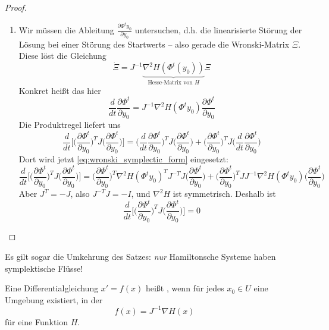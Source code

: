 \begin{proof}
\begin{enumerate}[label=(zu \arabic*), leftmargin=*]
		\item Wir müssen die Ableitung $\frac{\partial \Phi^t y_0}{\partial y_0}$ untersuchen, d.h. die linearisierte Störung der Lösung bei einer Störung des Startwerts -- also gerade die Wronski-Matrix $\Xi$. Diese löst die Gleichung
		\begin{equation*}
			\dot \Xi = J^{-1} \underbrace{\nabla^2 H( \Phi^t(y_0) )}_{\text{Hesse-Matrix von $H$}} \Xi
		\end{equation*}
		Konkret heißt das hier
		\begin{equation}
			\label{eq:wronski_symplectic_form}
			\frac{d}{dt} \frac{\partial \Phi^t}{\partial y_0}
			= J^{-1} \nabla^2 H(\Phi^t y_0) \frac{\partial \Phi^t}{\partial y_0}
		\end{equation}
		Die Produktregel liefert uns
		\begin{equation*}
			\frac{d}{dt}\bigg[ \bigg(\frac{\partial \Phi^t}{\partial y_0}\bigg)^T J \bigg(\frac{\partial \Phi^t}{\partial y_0}\bigg) \bigg]
			= \bigg( \frac{d}{dt} \frac{\partial \Phi^t}{\partial y_0} \bigg)^T J \bigg( \frac{\partial \Phi^t}{\partial y_0} \bigg)
			+ \bigg( \frac{\partial \Phi^t}{\partial y_0} \bigg)^T J \bigg( \frac{d}{dt} \frac{\partial \Phi^t}{\partial y_0} \bigg)
		\end{equation*}
		Dort wird jetzt \eqref{eq:wronski_symplectic_form} eingesetzt:
		\begin{equation*}
			\frac{d}{dt}\bigg[ \bigg(\frac{\partial \Phi^t}{\partial y_0}\bigg)^T J \bigg(\frac{\partial \Phi^t}{\partial y_0}\bigg) \bigg]
			=
			\bigg(\frac{\partial \Phi^t}{\partial y_0}\bigg)^T \nabla^2 H(\Phi^t y_0)^T J^{-T} J \bigg(\frac{\partial \Phi^t}{\partial y_0}\bigg)
			+ \bigg(\frac{\partial \Phi^t}{\partial y_0}\bigg)^T J J^{-1} \nabla^2 H(\Phi^t y_0) \bigg(\frac{\partial \Phi^t}{\partial y_0}\bigg)
		\end{equation*}
		Aber $J^T = -J$, also $J^{-T} J = -I$, und $\nabla^2 H$ ist symmetrisch. Deshalb ist
		\begin{equation*}
			\frac{d}{dt}\bigg[ \bigg(\frac{\partial \Phi^t}{\partial y_0}\bigg)^T
			J
			\bigg(\frac{\partial \Phi^t}{\partial y_0}\bigg) \bigg]
			= 0
		\end{equation*}
	\end{enumerate}
\end{proof}

Es gilt sogar die Umkehrung des Satzes:
\textit{nur} Hamiltonsche Systeme haben symplektische Flüsse!

\begin{definition}
	Eine Differentialgleichung $x' = f(x)$ heißt , wenn für jedes $x_0 \in U$ eine Umgebung existiert, in der
	\begin{equation*}
		f(x) = J^{-1} \nabla H(x)
	\end{equation*}
	für eine Funktion $H$.
\end{definition}

